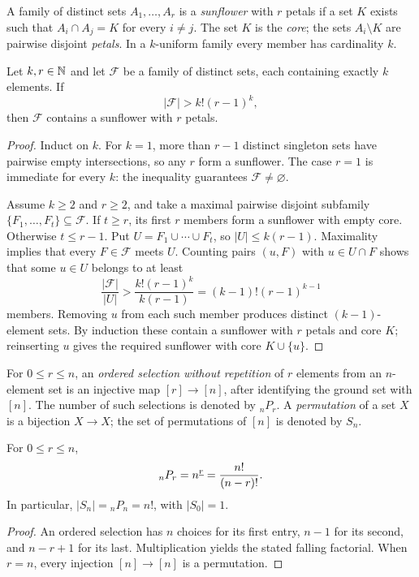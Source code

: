 \documentclass[11pt, oneside]{article}
\begin{document}
\begin{definition}[Sunflower]
A family of distinct sets $A_1, \ldots, A_r$ is a \emph{sunflower} with $r$ petals if a set $K$ exists such that $A_i\cap A_j=K$ for every $i\ne j$. The set $K$ is the \emph{core}; the sets $A_i\setminus K$ are pairwise disjoint \emph{petals}. In a $k$-uniform family every member has cardinality $k$.
\end{definition}
\begin{lemma}\label{lem:sunflower}
Let $k, r\in\mathbb{N}$ and let $\mathcal F$ be a family of distinct sets, each containing exactly $k$ elements. If
\[
|\mathcal F|>k!(r-1)^k,
\]
then $\mathcal F$ contains a sunflower with $r$ petals.
\end{lemma}
\begin{proof}
Induct on $k$. For $k=1$, more than $r-1$ distinct singleton sets have pairwise empty intersections, so any $r$ form a sunflower. The case $r=1$ is immediate for every $k$: the inequality guarantees $\mathcal F\ne\varnothing$.

Assume $k\ge2$ and $r\ge2$, and take a maximal pairwise disjoint subfamily $\{F_1, \ldots, F_t\}\subseteq\mathcal F$. If $t\ge r$, its first $r$ members form a sunflower with empty core. Otherwise $t\le r-1$. Put $U=F_1\cup\cdots\cup F_t$, so $|U|\le k(r-1)$. Maximality implies that every $F\in\mathcal F$ meets $U$. Counting pairs $(u, F)$ with $u\in U\cap F$ shows that some $u\in U$ belongs to at least
\[
\frac{|\mathcal F|}{|U|}>\frac{k!(r-1)^k}{k(r-1)}=(k-1)!(r-1)^{k-1}
\]
members. Removing $u$ from each such member produces distinct $(k-1)$-element sets. By induction these contain a sunflower with $r$ petals and core $K$; reinserting $u$ gives the required sunflower with core $K\cup\{u\}$.
\end{proof}

\begin{definition}
For $0\le r\le n$, an \emph{ordered selection without repetition} of $r$ elements from an $n$-element set is an injective map $[r]\to[n]$, after identifying the ground set with $[n]$. The number of such selections is denoted by ${}_nP_r$. A \emph{permutation} of a set $X$ is a bijection $X\to X$; the set of permutations of $[n]$ is denoted by $S_n$.
\end{definition}
\begin{proposition}
For $0\le r\le n$,
\[
{}_nP_r=n^{\underline{r}}=\frac{n!}{(n-r)!}.
\]
In particular, $|S_n|={}_nP_n=n!$, with $|S_0|=1$.
\end{proposition}
\begin{proof}
An ordered selection has $n$ choices for its first entry, $n-1$ for its second, and $n-r+1$ for its last. Multiplication yields the stated falling factorial. When $r=n$, every injection $[n]\to[n]$ is a permutation.
\end{proof}
\end{document}
